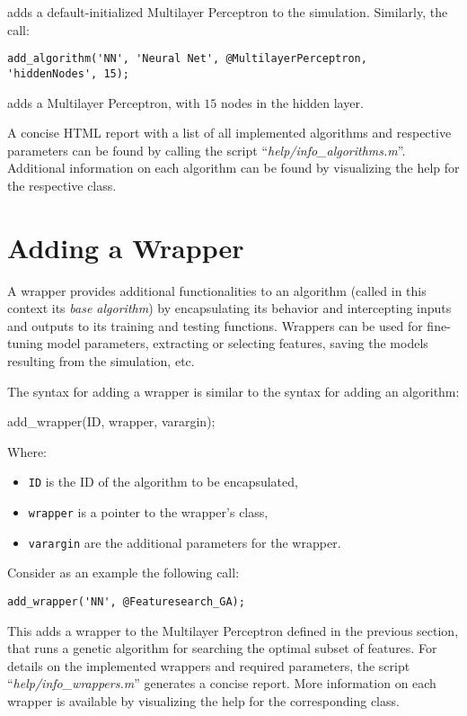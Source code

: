 \noindent adds a default-initialized Multilayer Perceptron to the simulation. Similarly, the call:

\begin{lstlisting}
add_algorithm('NN', 'Neural Net', @MultilayerPerceptron, 'hiddenNodes', 15);
\end{lstlisting}

\noindent adds a Multilayer Perceptron, with $15$ nodes in the hidden layer.

A concise HTML report with a list of all implemented algorithms and respective parameters can be found by calling the script ``\textit{help/info\_algorithms.m}''. Additional information on each algorithm can be found by visualizing the help for the respective class.

\section{Adding a Wrapper}

A wrapper provides additional functionalities to an algorithm (called in this context its \textit{base algorithm}) by encapsulating its behavior and intercepting inputs and outputs to its training and testing functions. Wrappers can be used for fine-tuning model parameters, extracting or selecting features, saving the models resulting from the simulation, etc.

The syntax for adding a wrapper is similar to the syntax for adding an algorithm:

\begin{console}
add_wrapper(ID, wrapper, varargin);
\end{console}

\noindent Where:

\begin{itemize}
\item \verb|ID| is the ID of the algorithm to be encapsulated,
\item \verb|wrapper| is a pointer to the wrapper’s class,
\item \verb|varargin| are the additional parameters for the wrapper.
\end{itemize}

\noindent Consider as an example the following call:
\begin{lstlisting}
add_wrapper('NN', @Featuresearch_GA);
\end{lstlisting}

\noindent This adds a wrapper to the Multilayer Perceptron defined in the previous section, that runs a genetic algorithm for searching the optimal subset of features. For details on the implemented wrappers and required parameters, the script ``\textit{help/info\_wrappers.m}'' generates a concise report. More information on each wrapper is available by visualizing the help for the corresponding class.

